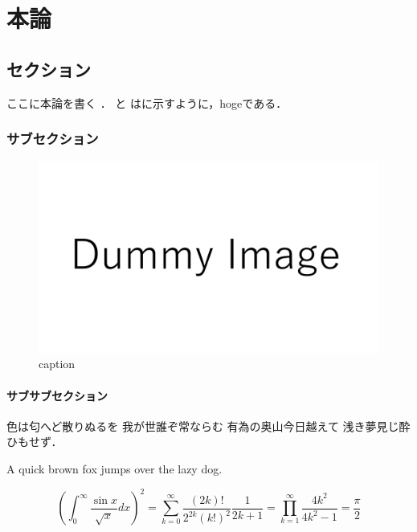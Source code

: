 \documentclass[main]{subfiles}
\begin{document}
\chapter{本論}
\section{セクション}
ここに本論を書く \cite{ref:yao2017integrated} \cite{ref:ugarte1992curling} \cite{ref:nomura2022uwb}．
と はに示すように，hogeである．

\subsection{サブセクション}

\begin{figure}[htbp]
    \centering
    \includegraphics[keepaspectratio, width=\linewidth]{figures/dummy.pdf}
    \caption{caption}
    \label{fig:label}
\end{figure}

\subsubsection{サブサブセクション}

色は匂へど散りぬるを 我が世誰ぞ常ならむ 有為の奥山今日越えて 浅き夢見じ酔ひもせず．


A quick brown fox jumps over the lazy dog.


\begin{equation}
    \left( \int_{0}^\infty \frac{\sin x}{\sqrt {x}} dx \right)^{2}
    = \sum_{k = 0}^\infty \frac{(2k)!}{2^{2k}(k!)^{2}} \frac{1}{2k + 1}
    = \prod_{k = 1}^\infty \frac{4k^{2}}{4k^{2} - 1} = \frac{\pi}{2}
    \label{eq:label}
\end{equation}
\end{document}
